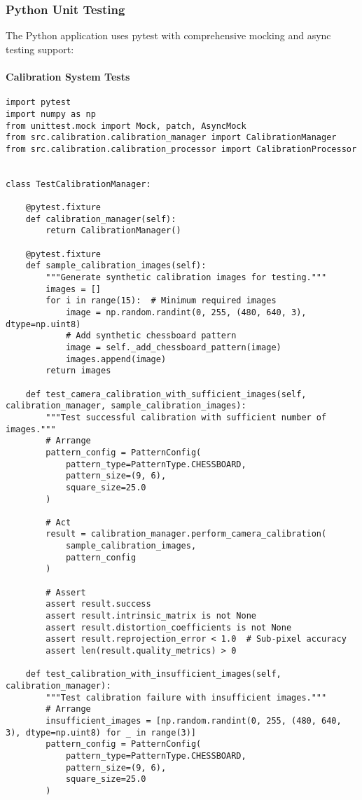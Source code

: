 \documentclass[11pt,a4paper]{report}
\begin{document}
\subsubsection{Python Unit Testing}

The Python application uses pytest with comprehensive mocking and async testing support:

\paragraph{Calibration System Tests}

\begin{verbatim}
import pytest
import numpy as np
from unittest.mock import Mock, patch, AsyncMock
from src.calibration.calibration_manager import CalibrationManager
from src.calibration.calibration_processor import CalibrationProcessor


class TestCalibrationManager:

    @pytest.fixture
    def calibration_manager(self):
        return CalibrationManager()

    @pytest.fixture
    def sample_calibration_images(self):
        """Generate synthetic calibration images for testing."""
        images = []
        for i in range(15):  # Minimum required images
            image = np.random.randint(0, 255, (480, 640, 3), dtype=np.uint8)
            # Add synthetic chessboard pattern
            image = self._add_chessboard_pattern(image)
            images.append(image)
        return images

    def test_camera_calibration_with_sufficient_images(self, calibration_manager, sample_calibration_images):
        """Test successful calibration with sufficient number of images."""
        # Arrange
        pattern_config = PatternConfig(
            pattern_type=PatternType.CHESSBOARD,
            pattern_size=(9, 6),
            square_size=25.0
        )

        # Act
        result = calibration_manager.perform_camera_calibration(
            sample_calibration_images,
            pattern_config
        )

        # Assert
        assert result.success
        assert result.intrinsic_matrix is not None
        assert result.distortion_coefficients is not None
        assert result.reprojection_error < 1.0  # Sub-pixel accuracy
        assert len(result.quality_metrics) > 0

    def test_calibration_with_insufficient_images(self, calibration_manager):
        """Test calibration failure with insufficient images."""
        # Arrange
        insufficient_images = [np.random.randint(0, 255, (480, 640, 3), dtype=np.uint8) for _ in range(3)]
        pattern_config = PatternConfig(
            pattern_type=PatternType.CHESSBOARD,
            pattern_size=(9, 6),
            square_size=25.0
        )


\end{verbatim}
\end{document}

